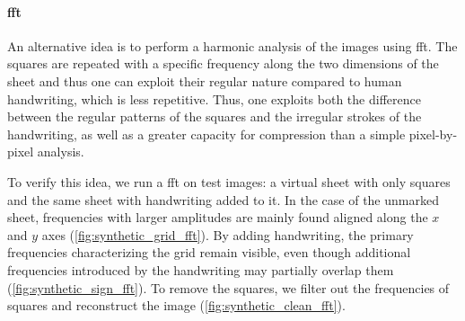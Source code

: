 \paragraph{\gls{fft}}
    An alternative idea is to perform a harmonic analysis of the images using \gls{fft}. The squares are repeated with a specific frequency along the two dimensions of the sheet and thus one can exploit their regular nature compared to human handwriting, which is less repetitive. Thus, one exploits both the difference between the regular patterns of the squares and the irregular strokes of the handwriting, as well as a greater capacity for compression than a simple pixel-by-pixel analysis.

\begin{modified}
    \noindent To verify this idea, we run a \gls{fft} on test images: a virtual sheet with only squares and the same sheet with handwriting added to it. In the case of the unmarked sheet, frequencies with larger amplitudes are mainly found aligned along the $x$ and $y$ axes (\cref{fig:synthetic_grid_fft}). By adding handwriting, the primary frequencies characterizing the grid remain visible, even though additional frequencies introduced by the handwriting may partially overlap them (\cref{fig:synthetic_sign_fft}). To remove the squares, we filter out the frequencies of squares and reconstruct the image (\cref{fig:synthetic_clean_fft}).
\end{modified}

